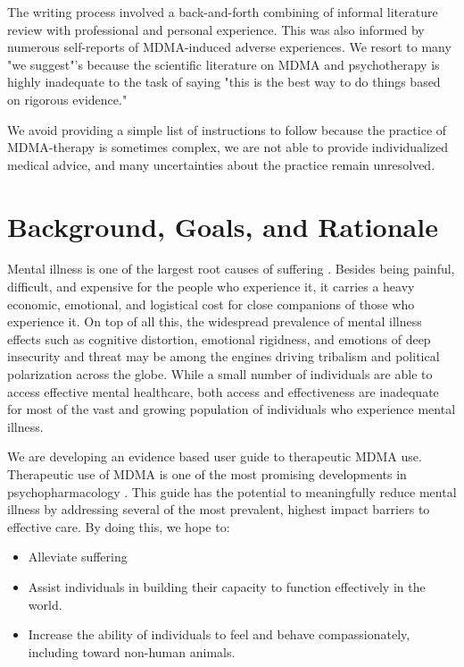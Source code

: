 \documentclass[12pt,letterpaper]{article}
\begin{document}
The writing process involved a back-and-forth combining of informal literature review with professional and personal experience. This was also informed by numerous self-reports of MDMA-induced adverse experiences. We resort to many "we suggest"'s because the scientific literature on MDMA and psychotherapy is highly inadequate to the task of saying "this is the best way to do things based on rigorous evidence."  

We avoid providing a simple list of instructions to follow because the practice of MDMA-therapy is sometimes complex, we are not able to provide individualized medical advice, and many uncertainties about the practice remain unresolved.

\section{Background, Goals, and Rationale}

Mental illness is one of the largest root causes of suffering \cite{mentalhealthpriority}. Besides being painful, difficult, and expensive for the people who experience it, it carries a heavy economic, emotional, and logistical cost for close companions of those who experience it. On top of all this, the widespread prevalence of mental illness effects such as cognitive distortion, emotional rigidness, and emotions of deep insecurity and threat may be among the engines driving tribalism and political polarization across the globe. While a small number of individuals are able to access effective mental healthcare, both access and effectiveness are inadequate for most of the vast and growing population of individuals who experience mental illness.

We are developing an evidence based user guide to therapeutic MDMA use. Therapeutic use of MDMA is one of the most promising developments in psychopharmacology \cite{mitchellMDMAClinicalTrial2}. This guide has the potential to meaningfully reduce mental illness by addressing several of the most prevalent, highest impact barriers to effective care. By doing this, we hope to:
\begin{itemize}
	\item Alleviate suffering
	\item Assist individuals in building their capacity to function effectively in the world.
	\item Increase the ability of individuals to feel and behave compassionately, including toward non-human animals.
\end{itemize}
\end{document}

